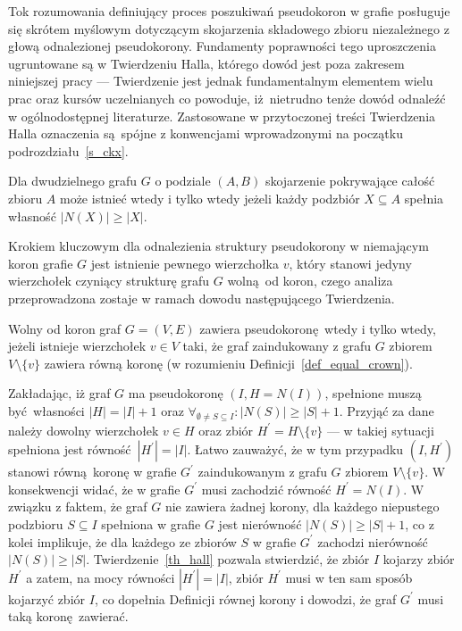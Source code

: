 \par{
  Tok rozumowania definiujący proces poszukiwań pseudokoron w grafie posługuje się skrótem myślowym dotyczącym skojarzenia składowego zbioru niezależnego z głową odnalezionej pseudokorony. 
  Fundamenty poprawności tego uproszczenia ugruntowane są w Twierdzeniu Halla, którego dowód jest poza zakresem niniejszej pracy --- Twierdzenie jest jednak fundamentalnym elementem wielu prac oraz kursów uczelnianych co powoduje, iż nietrudno tenże dowód odnaleźć w ogólnodostępnej literaturze.
  Zastosowane w przytoczonej treści Twierdzenia Halla oznaczenia są spójne z konwencjami wprowadzonymi na początku podrozdziału~\ref{s_ckx}.
  \begin{theorem}
    Dla dwudzielnego grafu $G$ o podziale $(A, B)$ skojarzenie pokrywające całość zbioru $A$ może istnieć wtedy i tylko wtedy jeżeli każdy podzbiór $X \subseteq A$ spełnia własność $|N(X)| \geq |X|$.
  \end{theorem}

  Krokiem kluczowym dla odnalezienia struktury pseudokorony w niemającym koron grafie $G$ jest istnienie pewnego wierzchołka $v$, który stanowi jedyny wierzchołek czyniący strukturę grafu $G$ wolną od koron, czego analiza przeprowadzona zostaje w ramach dowodu następującego Twierdzenia.

  \begin{theorem}
    Wolny od koron graf $G=(V, E)$ zawiera pseudokoronę wtedy i tylko wtedy, jeżeli istnieje wierzchołek $v \in V$ taki, że graf zaindukowany z grafu $G$ zbiorem $V\setminus \{v\}$ zawiera równą koronę (w rozumieniu Definicji~\ref{def_equal_crown}).
  \end{theorem}
  \begin{bproof}
    Zakładając, iż graf $G$ ma pseudokoronę $(I, H=N(I))$, spełnione muszą być własności $|H| = |I| + 1$ oraz $\forall_{\emptyset\neq S \subseteq I}:{|N(S)|\geq|S|+1}$.
    Przyjąć za dane należy dowolny wierzchołek $v \in H$ oraz zbiór $H^\prime=H \setminus \{v\}$ --- w takiej sytuacji spełniona jest równość $|H^\prime|=|I|$.
    Łatwo zauważyć, że w tym przypadku $(I, H^\prime)$ stanowi równą koronę w grafie $G^\prime$ zaindukowanym z grafu $G$ zbiorem $V \setminus \{v\}$.
    W konsekwencji widać, że w grafie $G^\prime$ musi zachodzić równość $H^\prime = N(I)$.
    W związku z faktem, że graf $G$ nie zawiera żadnej korony, dla każdego niepustego podzbioru $S \subseteq I$ spełniona w grafie $G$ jest nierówność $|N(S)| \geq |S|+1$, co z kolei implikuje, że dla każdego ze zbiorów $S$  w grafie $G^\prime$ zachodzi nierówność $|N(S)| \geq |S|$.
    Twierdzenie~\ref{th_hall} pozwala stwierdzić, że zbiór $I$ kojarzy zbiór $H^\prime$ a zatem, na mocy równości $|H^\prime|=|I|$, zbiór $H^\prime$ musi w ten sam sposób kojarzyć zbiór $I$, co dopełnia Definicji równej korony i dowodzi, że graf $G^\prime$ musi taką koronę zawierać.


\end{bproof}}
